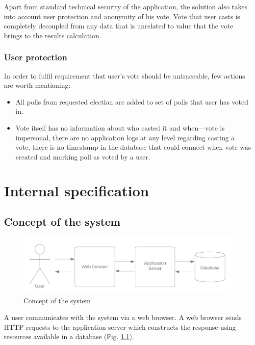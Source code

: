 \documentclass[a4paper,twoside,12pt]{book}
\begin{document}
    Apart from standard technical security of the application, the solution also takes into account user protection and anonymity of his vote.
    Vote that user casts is completely decoupled from any data that is unrelated to value that the vote brings to the results calculation.

    \subsection{User protection}
      In order to fulfil requirement that user's vote should be untraceable, few actions are worth mentioning:
      \begin{itemize}
        \item All polls from requested election are added to set of polls that user has voted in.
        \item Vote itself has no information about who casted it and when---vote is impersonal, 
          there are no application logs at any level regarding casting a vote, 
          there is no timestamp in the database that could connect when vote was created and marking poll as voted by a user.
      \end{itemize}

\chapter{Internal specification}
  \section{Concept of the system}
    \begin{figure}[t]
      \includegraphics[width=\linewidth]{system_concept.png}
      \caption{Concept of the system}
      \label{fig:system_concept}
    \end{figure}

    
    A user communicates with the system via a web browser. 
    A web browser sends HTTP requests to the application server which constructs the response using resources available in a database (Fig. \ref{fig:system_concept}).
\end{document}
